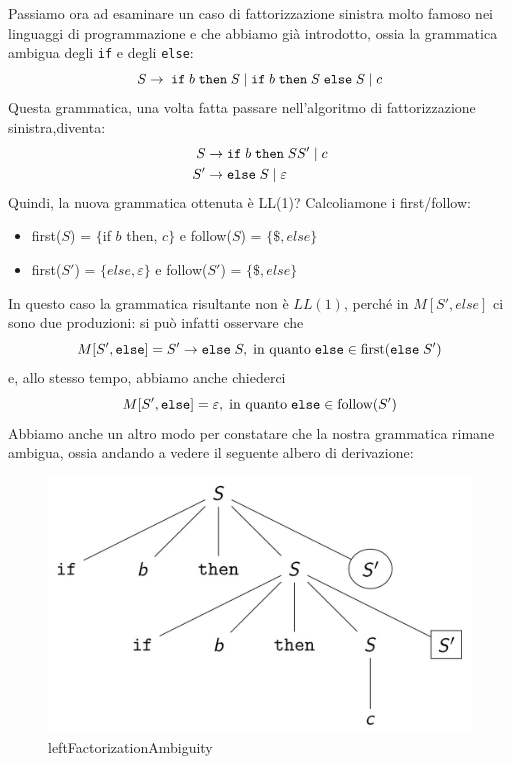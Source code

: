 \documentclass[class=book, crop=false, oneside, 12pt]{standalone}
\begin{document}
Passiamo ora ad esaminare un caso di fattorizzazione sinistra molto famoso nei linguaggi di programmazione e che abbiamo già introdotto, ossia la grammatica ambigua degli \texttt{if} e degli \texttt{else}:
\begin{equation*}
    S \rightarrow \; \textrm{\texttt{if}} \; b \; \textrm{\texttt{then}} \; S \mid \textrm{\texttt{if}} \; b \; \textrm{\texttt{then}} \; S \; \textrm{\texttt{else}} \; S \mid c  
\end{equation*}
Questa grammatica, una volta fatta passare nell'algoritmo di fattorizzazione sinistra,diventa:
\begin{align*}
    S &\rightarrow \textrm{\texttt{if}} \; b \; \textrm{\texttt{then}} \; SS' \mid c \\
    S' &\rightarrow \textrm{\texttt{else}} \; S \mid \varepsilon
\end{align*}
Quindi, la nuova grammatica ottenuta è LL(1)? Calcoliamone i first/follow: 
\begin{itemize}
    \item first(\(S\)) = \(\{\)if \(b\) then, \(c\}\) e follow(\(S\)) = \(\{\$, else\}\)
    \item first(\(S'\)) = \(\{else, \varepsilon\}\) e follow(\(S'\)) = \(\{\$, else\}\)
\end{itemize}  
In questo caso la grammatica risultante non è \(LL(1)\), perché in \(M[S', else]\) ci sono due produzioni: si può infatti osservare che 
\begin{equation*}
    M[S', \textrm{\texttt{else}}] = S' \rightarrow \textrm{\texttt{else}} \; S, \; \textrm{in quanto} \; \textrm{\texttt{else}} \in \textrm{first}(\textrm{\texttt{else}} \; S')
\end{equation*} 
e, allo stesso tempo, abbiamo anche chiederci
\begin{equation*}
    M[S', \textrm{\texttt{else}}] = \varepsilon, \; \textrm{in quanto} \; \textrm{\texttt{else}} \in \textrm{follow}(S')
\end{equation*}
Abbiamo anche un altro modo per constatare che la nostra grammatica rimane ambigua, ossia andando a vedere il seguente albero di derivazione:
\begin{figure}[H]
    \centering
    \includegraphics[width=.7\textwidth,keepaspectratio]{leftFactorizationAmbiguity.png}
    \caption{leftFactorizationAmbiguity}
    \label{leftFactorizationAmbiguity}
\end{figure}
\end{document}
